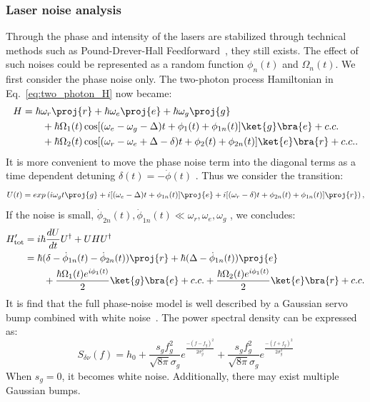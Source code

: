 \documentclass[11pt]{article}
\begin{document}
\subsubsection{Laser noise analysis}
Through the phase and intensity of the lasers are stabilized through technical methods such as Pound-Drever-Hall Feedforward~\cite{chao2023pounddreverhall}, they still exists.
The effect of such noises could be represented as a random function $\phi_{n}(t)$ and $\Omega_{n}(t)$. We first consider the phase noise only. The two-photon process Hamiltonian in Eq.~\eqref{eq:two_photon_H} now became:
\begin{align*}
    H &= \hbar \omega_r \proj{r} + \hbar \omega_e \proj{e} +\hbar \omega_g \proj{g}  \\
    & \quad \quad + \hbar \Omega_1(t) \cos[(\omega_e - \omega_g -\Delta)t + \phi_1(t) +  \phi_{1n}(t)]\ket{g}\bra{e} + c.c. \\
    & \quad \quad +\hbar \Omega_2(t) \cos[(\omega_r - \omega_e +\Delta -\delta)t + \phi_2(t) +  \phi_{2n}(t)]\ket{e}\bra{r} + c.c..
\end{align*}
It is more convenient to move the phase noise term into the diagonal terms as a time dependent detuning $\delta(t) = -\dot{\phi}(t)$ . Thus we consider the transition:
\begin{align}
    U(t) = exp\left(i\omega_g t \proj{g} + i[(\omega_e - \Delta)t + \phi_{1n}(t)] \proj{e} + i[(\omega_r - \delta)t + \phi_{2n}(t) + \phi_{1n}(t)] \proj{r}\right),
\end{align}
If the noise is small, $\dot{\phi}_{2n}(t),\dot{\phi}_{1n}(t) \ll \omega_r,\omega_e,\omega_g$ , we concludes:
\begin{align}
H'_{\rm tot} &= i\hbar \frac{dU}{dt} U^\dagger + UHU^\dagger \\
&= \hbar (\delta -\dot{\phi}_{1n}(t)-\dot{\phi}_{2n}(t) ) \proj{r} + \hbar (\Delta - \dot{\phi}_{1n}(t)) \proj{e}   \notag \\
&\quad \quad + \frac{\hbar \Omega_1(t) e^{i \phi_1(t)}}{2} \ket{g}\bra{e} + c.c. +\frac{\hbar \Omega_2(t) e^{i \phi_1(t)}}{2} \ket{e}\bra{r} + c.c. 
\end{align}
It is find that the full phase-noise model is well described by a Gaussian servo bump combined with white noise~\cite{PhysRevA.107.042611}. The power spectral density can be expressed as:
\[S_{\delta \nu}(f) = h_0 + \frac{s_g f_g^2}{\sqrt{8\pi} \sigma_g} e^{\frac{-(f - f_g)^2}{2\sigma_g^2}} + \frac{s_g f_g^2}{\sqrt{8\pi} \sigma_g}  e^{\frac{-(f + f_g)^2}{2\sigma_g^2}}\]
When \(s_g = 0\), it becomes white noise. Additionally, there may exist multiple Gaussian bumps. 
\end{document}
